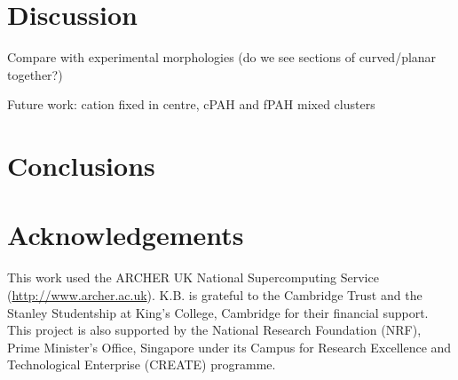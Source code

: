 \section{Discussion}
Compare with experimental morphologies (do we see sections of curved/planar together?)

Future work: cation fixed in centre, cPAH and fPAH mixed clusters

\section{Conclusions}


\section*{Acknowledgements}
This work used the ARCHER UK National Supercomputing Service (\url{http://www.archer.ac.uk}).
K.B. is grateful to the Cambridge Trust and the Stanley Studentship at King's College, Cambridge for their financial support.
This project is also supported by the National Research Foundation (NRF), Prime Minister's Office, Singapore under its Campus for Research Excellence and Technological Enterprise (CREATE) programme.
